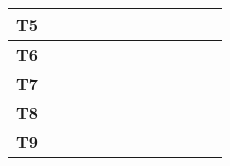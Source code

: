 \begin{table}[!h]
\begin{tabular}{c|c|c|c|c|c|c|c|c|c|c|c}
	\textbf{T5}      &                                                     &                                                     &                                                     &                                                     & \textbf{\checkmark} &                                                     &                                                     &                                                     &                                                     &                                                     &                                                     \\ \hline
	\textbf{T6}      &                                                     &                                                     &                                                     &                                                     &                                                     &                                                     & \textbf{\checkmark} &                                                     &                                                     &                                                     &                                                     \\ \hline
	\textbf{T7}      &                                                     &                                                     &                                                     &                                                     &                                                     &                                                     & \textbf{\checkmark} & \textbf{\checkmark} &                                                     &                                                     &                                                     \\ \hline
	\textbf{T8}      &                                                     &                                                     &                                                     &                                                     &                                                     &                                                     & \textbf{\checkmark} & \textbf{\checkmark} &                                                     &                                                     &                                                     \\ \hline
	\textbf{T9}      &                                                     &                                                     &                                                     &                                                     &                                                     &                                                     &                                                     &                                                     & \textbf{\checkmark} &                                                     &                                                     \\ \hline

\end{tabular}
\end{table}
